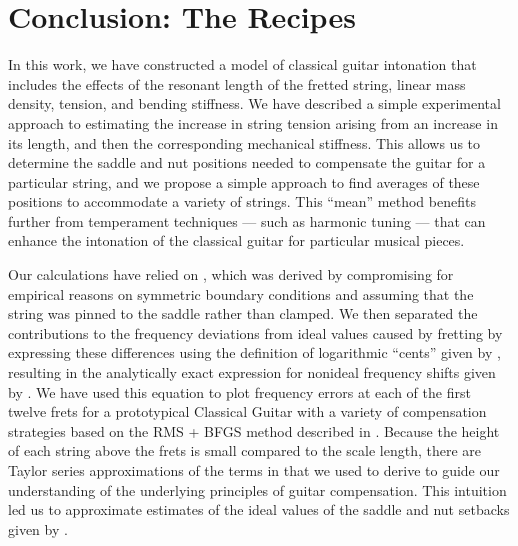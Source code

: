 %
%
%

 \section{Conclusion: The Recipes\label{sct:conc}}

 In this work, we have constructed a model of classical guitar intonation that includes the effects of the resonant length of the fretted string, linear mass density, tension, and bending stiffness. We have described a simple experimental approach to estimating the increase in string tension arising from an increase in its length, and then the corresponding mechanical stiffness. This allows us to determine the saddle and nut positions needed to compensate the guitar for a particular string, and we propose a simple approach to find averages of these positions to accommodate a variety of strings. This ``mean'' method benefits further from temperament techniques --- such as harmonic tuning --- that can enhance the intonation of the classical guitar for particular musical pieces.

Our calculations have relied on , which was derived by compromising for empirical reasons on symmetric boundary conditions and assuming that the string was pinned to the saddle rather than clamped. We then separated the contributions to the frequency deviations from ideal values caused by fretting by expressing these differences using the definition of logarithmic ``cents'' given by , resulting in the analytically exact expression for nonideal frequency shifts given by . We have used this equation to plot frequency errors at each of the first twelve frets for a prototypical Classical Guitar with a variety of compensation strategies based on the RMS + BFGS method described in . Because the height of each string above the frets is small compared to the scale length, there are Taylor series approximations of the terms in  that we used to derive  to guide our understanding of the underlying principles of guitar compensation. This intuition led us to approximate estimates of the ideal values of the saddle and nut setbacks given by .

